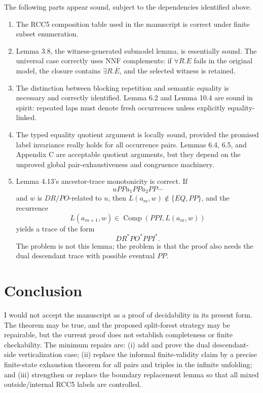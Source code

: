 \documentclass[11pt]{article}
\newcommand{\Comp}{\operatorname{Comp}}
\begin{document}
The following parts appear sound, subject to the dependencies identified above.

\begin{enumerate}
  \item The RCC5 composition table used in the manuscript is correct under finite subset enumeration.

  \item Lemma 3.8, the witness-generated submodel lemma, is essentially sound. The universal case correctly uses NNF complements: if $\forall R.E$ fails in the original model, the closure contains $\exists R.\overline E$, and the selected witness is retained.

  \item The distinction between blocking repetition and semantic equality is necessary and correctly identified. Lemma 6.2 and Lemma 10.4 are sound in spirit: repeated laps must denote fresh occurrences unless explicitly equality-linked.

  \item The typed equality quotient argument is locally sound, provided the promised label invariance really holds for all occurrence pairs. Lemmas 6.4, 6.5, and Appendix C are acceptable quotient arguments, but they depend on the unproved global pair-exhaustiveness and congruence machinery.

  \item Lemma 4.13's ancestor-trace monotonicity is correct. If
  \[
    uPPa_1PPa_2PP\cdots
  \]
  and $w$ is $DR/PO$-related to $u$, then $L(a_m,w)\notin\{EQ,PP\}$, and the recurrence
  \[
    L(a_{m+1},w)\in \Comp(PPI,L(a_m,w))
  \]
  yields a trace of the form
  \[
    DR^{\ast}PO^{\ast}PPI^{\ast}.
  \]
  The problem is not this lemma; the problem is that the proof also needs the dual descendant trace with possible eventual $PP$.
\end{enumerate}

\section{Conclusion}

I would not accept the manuscript as a proof of decidability in its present form. The theorem may be true, and the proposed split-forest strategy may be repairable, but the current proof does not establish completeness or finite checkability. The minimum repairs are: (i) add and prove the dual descendant-side verticalization case; (ii) replace the informal finite-validity claim by a precise finite-state exhaustion theorem for all pairs and triples in the infinite unfolding; and (iii) strengthen or replace the boundary replacement lemma so that all mixed outside/internal RCC5 labels are controlled.
\end{document}

